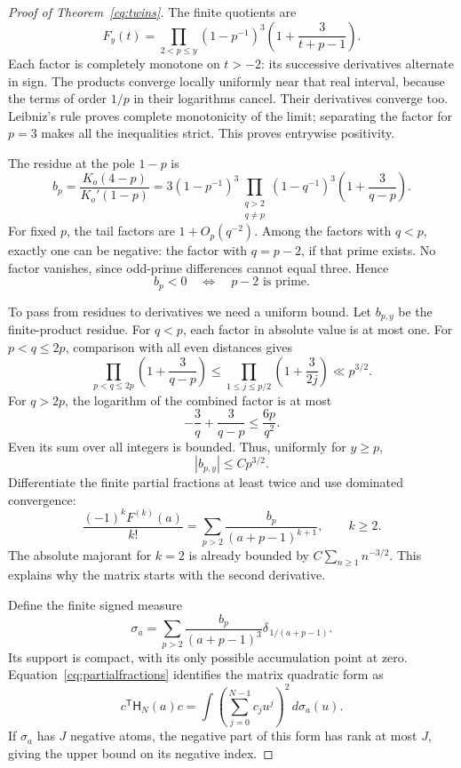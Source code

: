 \begin{proof}[Proof of Theorem~\ref{cq:twins}]
The finite quotients are
\[
 F_y(t)=\prod_{2<p\leq y}(1-p^{-1})^3
                  \left(1+\frac3{t+p-1}\right).
\]
Each factor is completely monotone on \(t>-2\): its successive derivatives
alternate in sign. The products converge locally uniformly near that real
interval, because the terms of order \(1/p\) in their logarithms cancel.
Their derivatives converge too. Leibniz's rule proves complete monotonicity
of the limit; separating the factor for \(p=3\) makes all the inequalities
strict. This proves entrywise positivity.

The residue at the pole \(1-p\) is
\[
 b_p=\frac{K_o(4-p)}{K_o'(1-p)}
 =3(1-p^{-1})^3
  \prod_{\substack{q>2\\q\ne p}}
       (1-q^{-1})^3\left(1+\frac3{q-p}\right).
\]
For fixed \(p\), the tail factors are \(1+O_p(q^{-2})\).
Among the factors with \(q<p\), exactly one can be negative:
the factor with \(q=p-2\), if that prime exists. No factor vanishes,
since odd-prime differences cannot equal three. Hence
\begin{equation}\label{cq:twinsign}
                b_p<0\quad\Longleftrightarrow\quad p-2\text{ is prime}.
\end{equation}

To pass from residues to derivatives we need a uniform bound. Let \(b_{p,y}\)
be the finite-product residue. For \(q<p\), each factor in absolute value
is at most one. For \(p<q\leq2p\), comparison with all even distances gives
\[
 \prod_{p<q\leq2p}\left(1+\frac3{q-p}\right)
 \leq\prod_{1\leq j\leq p/2}\left(1+\frac3{2j}\right)\ll p^{3/2}.
\]
For \(q>2p\), the logarithm of the combined factor is at most
\[
             -\frac3q+\frac3{q-p}\leq\frac{6p}{q^2}.
\]
Even its sum over all integers is bounded. Thus, uniformly for \(y\geq p\),
\[
                      |b_{p,y}|\leq C p^{3/2}.
\]
Differentiate the finite partial fractions at least twice and use dominated
convergence:
\begin{equation}\label{cq:partialfractions}
 \frac{(-1)^k F^{(k)}(a)}{k!}
       =\sum_{p>2}\frac{b_p}{(a+p-1)^{k+1}},\qquad k\geq2.
\end{equation}
The absolute majorant for \(k=2\) is already bounded by
\(C\sum_{n\geq1}n^{-3/2}\). This explains why the matrix starts with the
second derivative.

Define the finite signed measure
\[
 \sigma_a=\sum_{p>2}\frac{b_p}{(a+p-1)^3}
                      \delta_{\,1/(a+p-1)} .
\]
Its support is compact, with its only possible accumulation point at zero.
Equation~\eqref{cq:partialfractions} identifies the matrix quadratic form as
\[
 c^{\mathsf T}\mathsf H_N(a)c
       =\int\left(\sum_{j=0}^{N-1}c_j u^j\right)^2\,d\sigma_a(u).
\]
If \(\sigma_a\) has \(J\) negative atoms, the negative part of this form
has rank at most \(J\), giving the upper bound on its negative index.


\end{proof}
